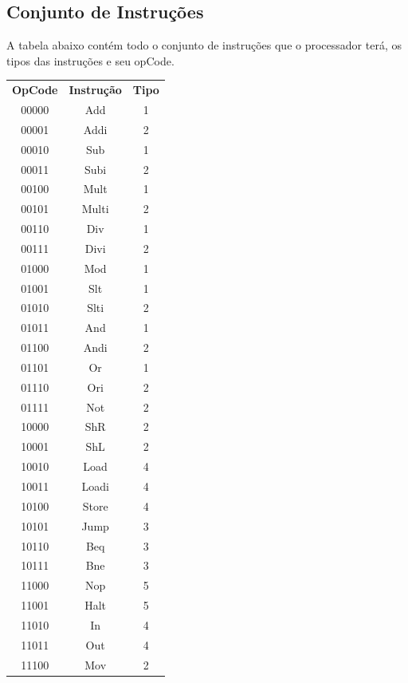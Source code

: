 \documentclass[a4paper, 12pt]{article}
\begin{document}
\subsection{Conjunto de Instruções}
A tabela abaixo contém todo o conjunto de instruções que o processador terá, os tipos das instruções e seu opCode.
\begin{center}
\begin{tabular}{ ccc }
 	\textbf{OpCode} & \textbf{Instrução} & \textbf{Tipo}\\
 	00000 & Add & 1\\
 	00001 & Addi & 2\\
 	00010 & Sub  & 1\\
 	00011 & Subi & 2\\
 	00100 & Mult & 1\\
 	00101 & Multi & 2\\
 	00110 & Div & 1\\
 	00111 & Divi & 2\\
 	01000 & Mod & 1\\
 	01001 & Slt & 1\\	
 	01010 & Slti & 2\\
 	01011 & And & 1\\
 	01100 & Andi & 2\\
 	01101 & Or & 1\\
 	01110 & Ori & 2\\
 	01111 & Not & 2\\
 	10000 & ShR & 2\\
 	10001 & ShL & 2\\
 	10010 & Load & 4\\
 	10011 & Loadi & 4\\
 	10100 & Store & 4\\
 	10101 & Jump & 3\\
 	10110 & Beq & 3\\
 	10111 & Bne & 3\\
 	11000 & Nop & 5\\
 	11001 & Halt & 5\\
 	11010 & In & 4\\
 	11011 & Out & 4\\
 	11100 & Mov & 2\\
  \end{tabular}
\end{center}
\end{document}
